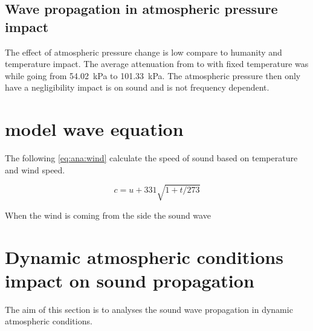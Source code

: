\subsection{Wave propagation in atmospheric pressure impact}
The effect of atmospheric pressure change is low compare to humanity and temperature impact. The average attenuation from  to  with fixed temperature was  while going from \SI{54.02}{\kilo\pascal} to \SI{101.33}{\kilo\pascal}. The atmospheric pressure then only have a negligibility impact is on sound and is not frequency dependent. 
 
 
 \section{model wave equation}
 The following \autoref{eq:ana:wind} calculate the speed of sound based on temperature and wind speed.

\begin{equation}\label{eq:ana:wind}
c = u + 331 \sqrt{1+t/273}
\end{equation}  

\startexplain
{}
\stopexplain

When the wind is coming from the side the sound wave 
 
\section{Dynamic atmospheric conditions impact on sound propagation} 
The aim of this section is to analyses the sound wave propagation in dynamic atmospheric conditions. 
 
